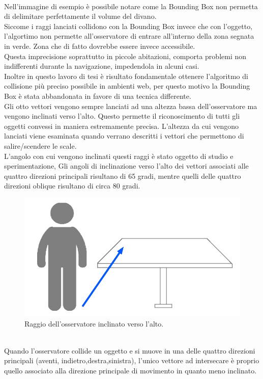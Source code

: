 \\
Nell’immagine di esempio è possibile notare come la Bounding Box non permetta di delimitare perfettamente il volume del divano.
\\
Siccome i raggi lanciati collidono con la Bounding Box invece che con l’oggetto, l’algortimo non permette all’osservatore di entrare all’interno della zona segnata in verde. Zona che di fatto dovrebbe essere invece accessibile.
\\
Questa imprecisione soprattutto in piccole abitazioni, comporta problemi non indifferenti durante la navigazione, impedendola in alcuni casi.
\\
Inoltre in questo lavoro di tesi è risultato fondamentale ottenere l’algoritmo di collisione più preciso possibile in ambienti web, per questo motivo la Bounding Box è stata abbandonata in favore di una tecnica differente.
\\
Gli otto vettori vengono sempre lanciati ad una altezza bassa dell’osservatore ma vengono inclinati verso l’alto. Questo permette il riconoscimento di tutti gli oggetti convessi in maniera estremamente precisa. L’altezza da cui vengono lanciati viene esaminata quando verrano descritti i vettori che permettono di salire/scendere le scale.
\\
L’angolo con cui vengono inclinati questi raggi è stato oggetto di studio e sperimentazione, 
Gli angoli di inclinazione verso l’alto dei vettori associati alle quattro direzioni principali risultano di 65 gradi, mentre quelli delle quattro direzioni oblique risultano di circa 80 gradi.
\\
\begin{figure}[htb]
 \centering
 \includegraphics[width=0.7\linewidth]{images/chapter_navigazione_scena/collision_tav3.jpg}\hfill
 \caption[Raggi inclinati verso l'alto.]{Raggio dell'osservatore inclinato verso l'alto.}
 \label{fig:navigazione_scena_collision_tav3}
\end{figure}
\\
Quando l’osservatore collide un oggetto e si muove in una delle quattro direzioni principali (aventi, indietro,destra,sinistra), l’unico vettore ad intersecare è proprio quello associato alla direzione principale di movimento in quanto meno inclinato.
